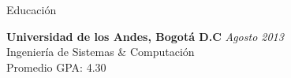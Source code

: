 \documentclass[spanish]{resume} %
\begin{document}

\begin{rSection}{Educaci\'on}

{\bf Universidad de los Andes, Bogot\'a D.C} \hfill {\em Agosto 2013} \\ 
Ingenier\'ia de Sistemas \& Computaci\'on \\
Promedio GPA: 4.30

\end{rSection}

\end{document}

